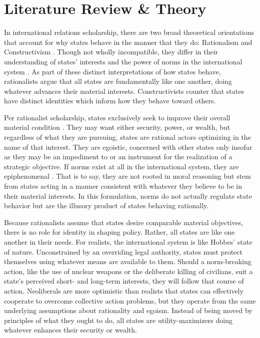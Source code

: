 \documentclass[12pt]{article}
\begin{document}
\section{Literature Review \& Theory}

In international relations scholarship, there are two broad theoretical orientations that account for why states behave in the manner that they do: Rationalism and Constructivism \citep{katzenstein_international_1998}. Though not wholly incompatible, they differ in their understanding of states' interests and the power of norms in the international system \citep{fearon_skeptical_2002}. As part of these distinct interpretations of how states behave, rationalists argue that all states are fundamentally like one another, doing whatever advances their material interests. Constructivists counter that states have distinct identities which inform how they behave toward others.

Per rationalist scholarship, states exclusively seek to improve their overall material condition \citep{waltz_theory_1979, keohane_after_1984}. They may want either security, power, or wealth, but regardless of what they are pursuing, states are rational actors optimizing in the name of that interest. They are egoistic, concerned with other states only insofar as they may be an impediment to or an instrument for the realization of a strategic objective. If norms exist at all in the international system, they are epiphenomenal \citep{sagan_realist_2004}. That is to say, they are not rooted in moral reasoning but stem from states acting in a manner consistent with whatever they believe to be in their material interests. In this formulation, norms do not actually regulate state behavior but are the illusory product of states behaving rationally.

Because rationalists assume that states desire comparable material objectives, there is no role for identity in shaping policy. Rather, all states are like one another in their needs. For realists, the international system is like Hobbes' state of nature. Unconstrained by an overriding legal authority, states must protect themselves using whatever means are available to them. Should a norm-breaking action, like the use of nuclear weapons or the deliberate killing of civilians, suit a state's perceived short- and long-term interests, they will follow that course of action. Neoliberals are more optimistic than realists that states can effectively cooperate to overcome collective action problems, but they operate from the same underlying assumptions about rationality and egoism. Instead of being moved by principles of what they ought to do, all states are utility-maximizers doing whatever enhances their security or wealth.
\end{document}
